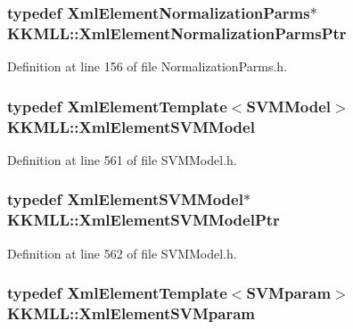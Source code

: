 \subsubsection[{\texorpdfstring{Xml\+Element\+Normalization\+Parms\+Ptr}{XmlElementNormalizationParmsPtr}}]{\setlength{\rightskip}{0pt plus 5cm}typedef {\bf Xml\+Element\+Normalization\+Parms}$\ast$ {\bf K\+K\+M\+L\+L\+::\+Xml\+Element\+Normalization\+Parms\+Ptr}}\hypertarget{namespace_k_k_m_l_l_abda3dc3436d2a426342612e38b3204a7}{}\label{namespace_k_k_m_l_l_abda3dc3436d2a426342612e38b3204a7}


Definition at line 156 of file Normalization\+Parms.\+h.

\subsubsection[{\texorpdfstring{Xml\+Element\+S\+V\+M\+Model}{XmlElementSVMModel}}]{\setlength{\rightskip}{0pt plus 5cm}typedef {\bf Xml\+Element\+Template}$<${\bf S\+V\+M\+Model}$>$ {\bf K\+K\+M\+L\+L\+::\+Xml\+Element\+S\+V\+M\+Model}}\hypertarget{namespace_k_k_m_l_l_abd686e81c259a1d4d8433acc9365c62e}{}\label{namespace_k_k_m_l_l_abd686e81c259a1d4d8433acc9365c62e}


Definition at line 561 of file S\+V\+M\+Model.\+h.

\subsubsection[{\texorpdfstring{Xml\+Element\+S\+V\+M\+Model\+Ptr}{XmlElementSVMModelPtr}}]{\setlength{\rightskip}{0pt plus 5cm}typedef {\bf Xml\+Element\+S\+V\+M\+Model}$\ast$ {\bf K\+K\+M\+L\+L\+::\+Xml\+Element\+S\+V\+M\+Model\+Ptr}}\hypertarget{namespace_k_k_m_l_l_aec21ceea3afbf36858e47f0fc0dbcd30}{}\label{namespace_k_k_m_l_l_aec21ceea3afbf36858e47f0fc0dbcd30}


Definition at line 562 of file S\+V\+M\+Model.\+h.

\subsubsection[{\texorpdfstring{Xml\+Element\+S\+V\+Mparam}{XmlElementSVMparam}}]{\setlength{\rightskip}{0pt plus 5cm}typedef {\bf Xml\+Element\+Template}$<${\bf S\+V\+Mparam}$>$ {\bf K\+K\+M\+L\+L\+::\+Xml\+Element\+S\+V\+Mparam}}\hypertarget{namespace_k_k_m_l_l_a5ddff9706fdda9d572717e645b404bf1}{}\label{namespace_k_k_m_l_l_a5ddff9706fdda9d572717e645b404bf1}


